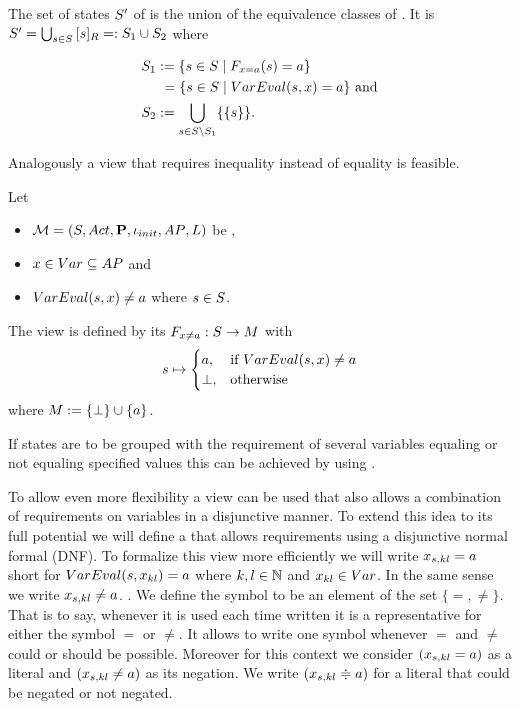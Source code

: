 \documentclass[preview]{standalone}
\begin{document}
The set of states $\states'$ of \viewparamvalueseq is the union of the equivalence classes of \eqrelview. It is $\states' = \bigcup_{\state \in \states} \eqclassv =: \states_1 \cup \states_2$ where

\begin{align*}
	\states_1 &:= \{\state \in \states \mid \gfctparamvalueseq(\state) = \varval\} \\
	&\hspace{1.15mm}= \{\state \in \states  \mid \vareval(\state, \var) = \varval\} \text{ and} \\
	\states_2 &:= \remstates.
\end{align*}

Analogously a view that requires inequality instead of equality is feasible.

\begin{definition}
	Let
	\begin{itemize}
		\item $\chgph = \chgphtuple$ be \chosengraphtypeN,
		\item $\var \in \vars \subseteq \atomicprops$ and 
		\item $\vareval(\state, \var) \neq \varval$ where $\state \in \states$.		
	\end{itemize} 
	The view \viewparamvaluesneq is defined by its \grpfctN $\gfctparamvaluesneq : \states \to \imggrp$ with
	\[
	\state \mapsto
	\begin{cases}
		\varval, &\text{if } \vareval(\state, \var) \neq \varval\\
		\remelem, 	&\text{otherwise}
	\end{cases}
	\]
	where $\imggrp := \remset \cup \{a\}$.
\end{definition}

If states are to be grouped with the requirement of several variables equaling or not equaling specified values this can be achieved by using \parllcompN. 

To allow even more flexibility a view can be used that also allows a combination of requirements on variables in a disjunctive manner. To extend this idea to its full potential we will define a \viewN that allows requirements using a disjunctive normal formal (DNF). To formalize this view more efficiently we will write $\varstate[,kl] = \varval$ short for $\vareval(\state, \var_{kl}) = \varval$ where $k,l \in \natnums$ and $x_{kl} \in \vars$. In the same sense we write $\varstate[,kl] \neq \varval$. . We define the symbol \eqorneq to be an element of the set $\{=,\neq\}$. That is to say, whenever it is used each time written it is a representative for either the symbol $=$ or $\neq$. It allows to write one symbol whenever $=$ and $\neq$ could or should be possible. Moreover for this context we consider $(\varstate[,kl] = \varval)$ as a literal and $(\varstate[,kl] \neq \varval)$ as its negation. We write $(\varstate[,kl] \eqorneq \varval)$ for a literal that could be negated or not negated.
\end{document}
